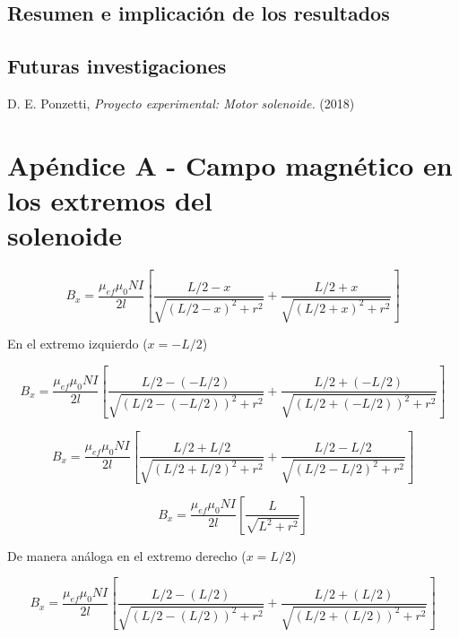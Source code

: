 \documentclass[a4paper,12pt]{article}
\begin{document}
    \subsection*{Resumen e implicación de los resultados}



    \subsection*{Futuras investigaciones}



\begin{thebibliography}{99}

    \bibitem{} D. E. Ponzetti, \emph{Proyecto experimental: Motor solenoide.} (2018)

\end{thebibliography}

\section*{Apéndice A - Campo magnético en los extremos del \\solenoide}

    \begin{equation*}
        B_x = \frac{\mu_{ef}\mu_0 N I}{2l} \left[ \frac{L/2 - x}{\sqrt{(L/2 - x)^2 + r^2}} + \frac{L/2 + x}{\sqrt{(L/2 + x)^2 + r^2}} \right]
    \end{equation*}

    En el extremo izquierdo ($x=-L/2$)

    \begin{equation*}
        B_x = \frac{\mu_{ef}\mu_0 N I}{2l} \left[ \frac{L/2 - (-L/2)}{\sqrt{(L/2 - (-L/2))^2 + r^2}} + \frac{L/2 + (-L/2)}{\sqrt{(L/2 + (-L/2))^2 + r^2}} \right]
    \end{equation*}

    \begin{equation*}
        B_x = \frac{\mu_{ef}\mu_0 N I}{2l} \left[ \frac{L/2 + L/2}{\sqrt{(L/2 + L/2)^2 + r^2}} + \frac{L/2 - L/2}{\sqrt{(L/2 - L/2)^2 + r^2}} \right]
    \end{equation*}

    \begin{equation*}
        B_x = \frac{\mu_{ef}\mu_0 N I}{2l} \left[ \frac{L}{\sqrt{L^2 + r^2}} \right]
    \end{equation*}

De manera análoga en el extremo derecho ($x=L/2$)

    \begin{equation*}
        B_x = \frac{\mu_{ef}\mu_0 N I}{2l} \left[ \frac{L/2 - (L/2)}{\sqrt{(L/2 - (L/2))^2 + r^2}} + \frac{L/2 + (L/2)}{\sqrt{(L/2 + (L/2))^2 + r^2}} \right]
    \end{equation*}
\end{document}
